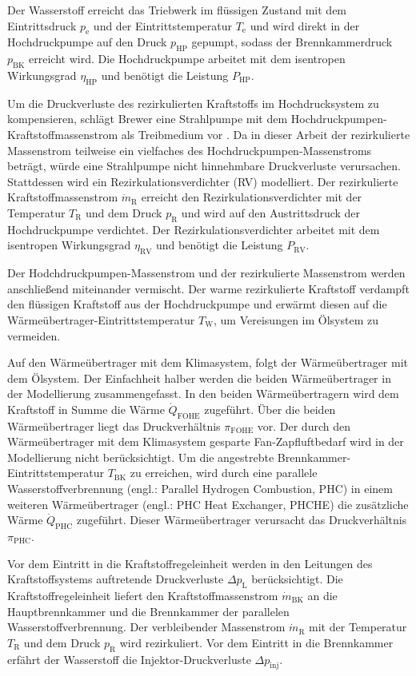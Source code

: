 Der Wasserstoff erreicht das Triebwerk im flüssigen Zustand mit dem Eintrittsdruck $p_\mathrm{e}$ und der Eintrittstemperatur $T_\mathrm{e}$ und wird direkt in der Hochdruckpumpe auf den Druck $p_{\mathrm{HP}}$ gepumpt, sodass der Brennkammerdruck $p_{\mathrm{BK}}$ erreicht wird. Die Hochdruckpumpe arbeitet mit dem isentropen Wirkungsgrad $\eta_{\mathrm{HP}}$ und benötigt die Leistung $P_{\mathrm{HP}}$. 

Um die Druckverluste des rezirkulierten Kraftstoffs im Hochdrucksystem zu kompensieren, schlägt Brewer eine Strahlpumpe mit dem  Hochdruckpumpen-Kraftstoffmassenstrom als Treibmedium vor \cite{Brewer.1991}. Da in dieser Arbeit der rezirkulierte Massenstrom teilweise ein vielfaches des Hochdruckpumpen-Massenstroms beträgt, würde eine Strahlpumpe nicht hinnehmbare Druckverluste verursachen. Stattdessen wird ein Rezirkulationsverdichter (RV) modelliert. Der rezirkulierte Kraftstoffmassenstrom $\dot{m}_\mathrm{R}$ erreicht den Rezirkulationsverdichter mit der Temperatur $T_\mathrm{R}$ und dem Druck $p_\mathrm{R}$ und wird auf den Austrittsdruck der Hochdruckpumpe verdichtet. Der Rezirkulationsverdichter arbeitet mit dem isentropen Wirkungsgrad $\eta_\mathrm{RV}$ und benötigt die Leistung $P_\mathrm{RV}$. 

Der Hodchdruckpumpen-Massenstrom und der rezirkulierte Massenstrom werden anschließend miteinander vermischt. Der warme rezirkulierte Kraftstoff verdampft den flüssigen Kraftstoff aus der Hochdruckpumpe und erwärmt diesen auf die Wärmeübertrager-Eintrittstemperatur $T_\mathrm{W}$, um Vereisungen im Ölsystem zu vermeiden.

Auf den Wärmeübertrager mit dem Klimasystem, folgt der Wärmeübertrager mit dem Ölsystem. Der Einfachheit halber werden die beiden Wärmeübertrager in der Modellierung zusammengefasst. In den beiden Wärmeübertragern wird dem Kraftstoff in Summe die Wärme $\dot{Q}_{\mathrm{FOHE}}$ zugeführt. Über die beiden Wärmeübertrager liegt das Druckverhältnis $\pi_{\mathrm{FOHE}}$ vor. Der durch den Wärmeübertrager mit dem Klimasystem gesparte Fan-Zapfluftbedarf wird in der Modellierung nicht berücksichtigt. Um die angestrebte Brennkammer-Eintrittstemperatur $T_{\mathrm{BK}}$ zu erreichen, wird durch eine parallele Wasserstoffverbrennung (engl.: Parallel Hydrogen Combustion, PHC) in einem weiteren Wärmeübertrager (engl.: PHC Heat Exchanger, PHCHE) die zusätzliche Wärme $\dot{Q}_{\mathrm{PHC}}$ zugeführt. Dieser Wärmeübertrager verursacht das Druckverhältnis $\pi_{\mathrm{PHC}}$. 

Vor dem Eintritt in die Kraftstoffregeleinheit werden in den Leitungen des Kraftstoffsystems auftretende Druckverluste $\Delta p_\mathrm{L}$  berücksichtigt. Die Kraftstoffregeleinheit liefert den Kraftstoffmassenstrom $\dot{m}_{\mathrm{BK}}$ an die Hauptbrennkammer und die Brennkammer der parallelen Wasserstoffverbrennung. Der verbleibender Massenstrom $\dot{m}_\mathrm{R}$ mit der Temperatur $T_\mathrm{R}$ und dem Druck $p_\mathrm{R}$ wird rezirkuliert. Vor dem Eintritt in die Brennkammer erfährt der Wasserstoff die Injektor-Druckverluste $\Delta p_{\mathrm{inj}}$. 


